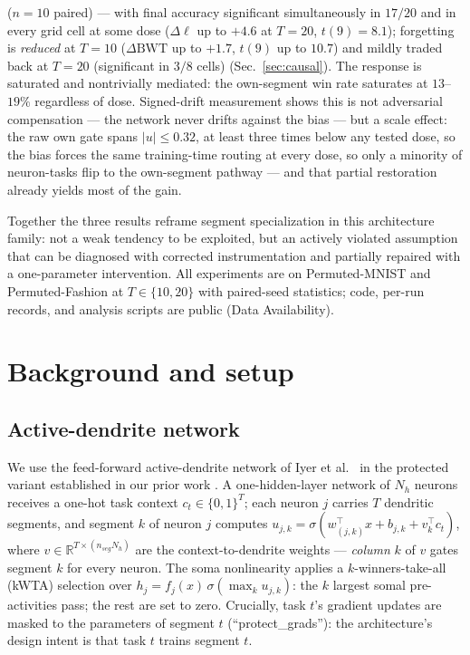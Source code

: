 \documentclass[review,12pt,number]{elsarticle}
\begin{document}
\begin{enumerate}
      ($n{=}10$ paired) --- with final accuracy significant simultaneously
      in $17/20$ and in every grid cell at some dose ($\Delta\ell$ up to
      $+4.6$ at $T{=}20$, $t(9){=}8.1$); forgetting is \emph{reduced} at
      $T{=}10$ ($\Delta\mathrm{BWT}$ up to $+1.7$, $t(9)$ up to $10.7$) and
      mildly traded back at $T{=}20$ (significant in $3/8$ cells)
      (Sec.~\ref{sec:causal}). The response is
      saturated and nontrivially mediated: the own-segment win rate
      saturates at $13$--$19\%$ regardless of dose. Signed-drift
      measurement shows this is not adversarial compensation --- the
      network never drifts against the bias --- but a scale effect: the
      raw own gate spans $|u| \le 0.32$, at least three times below any
      tested dose, so the bias forces the same training-time routing at
      every dose, so only a minority of neuron-tasks
      flip to the own-segment pathway --- and that partial restoration
      already yields most of the gain.
\end{enumerate}

Together the three results reframe segment specialization in this
architecture family: not a weak tendency to be exploited, but an
actively violated assumption that can be diagnosed with corrected
instrumentation and partially repaired with a one-parameter intervention.
All experiments are on Permuted-MNIST and Permuted-Fashion at
$T\in\{10,20\}$ with paired-seed statistics; code, per-run records, and
analysis scripts are public (Data Availability).

\section{Background and setup}
\label{sec:setup}

\subsection{Active-dendrite network}
\label{sec:adnet}

We use the feed-forward active-dendrite network of Iyer et al.\
\cite{iyer2022} in the protected variant established in our prior work
\cite{zhou2026delp}. A one-hidden-layer network of $N_h$ neurons receives a
one-hot task context $c_t \in \{0,1\}^{T}$; each neuron $j$ carries $T$
dendritic segments, and segment $k$ of neuron $j$ computes
$u_{j,k} = \sigma(w_{(j,k)}^\top x + b_{j,k} + v_{k}^\top c_t)$, where
$v \in \mathbb{R}^{T \times (n_{seg} N_h)}$ are the context-to-dendrite
weights --- \emph{column} $k$ of $v$ gates segment $k$ for every neuron.
The soma nonlinearity applies a $k$-winners-take-all (kWTA) selection over
$h_j = f_j(x)\, \sigma(\max_k u_{j,k})$: the $k$ largest somal pre-activities
pass; the rest are set to zero. Crucially, task $t$'s gradient updates are
masked to the parameters of segment $t$ (``protect\_grads''): the
architecture's design intent is that task $t$ trains segment $t$.
\end{document}
